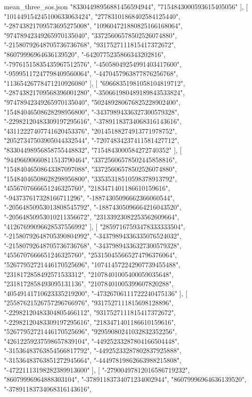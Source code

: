 \begin{filecontents*}[overwrite]{mean_three_sos.json}
    "83304498956881456594944",
    "7154843000593615405056"
   ],
   [
    "101449154245100633063424",
    "27783101868402584125440",
    "-28743821709573695275008",
    "109604721880825166168064",
    "97478942349265970135040",
    "33725606578502526074880",
    "-21580792648705736736768",
    "9317527111815417372672",
    "86079996964636139520",
    "-6420775235866343202816",
    "-79761515835435967512576",
    "-45058049254991403417600",
    "-95995117247798409560064",
    "-4470457963877876256768",
    "11365426778471210926080"
   ],
   [
    "69668351981058104819712",
    "-28743821709568396001280",
    "-350661980489189843533824",
    "97478942349265970135040",
    "502489280676825228902400",
    "15484046508628298956800",
    "-34379894336327300579328",
    "-22982120483309197295616",
    "-37891183734068316143616",
    "43112227407741620453376",
    "20145188274913771978752",
    "20527347503905044332544",
    "-72074834237411581427712",
    "83304498956858755448832",
    "7154843000584272740352"
   ],
   [
    "94496690660811513790464",
    "33725606578502445858816",
    "15484046508643387097088",
    "33725606578502526074880",
    "15484046508628298956800",
    "33535318510598378913792",
    "4556707666651246325760",
    "2183471401186610159616",
    "-943737617328166711296",
    "-18874305096662366060544",
    "-20564850953013808545792",
    "-18874305096664216043520",
    "-20564850953010211356672",
    "23133923082253562609664",
    "41267699096628537556992"
   ],
   [
    "28597167593478333333504",
    "-21580792648705390804992",
    "-34379894336335076524032",
    "-21580792648705736736768",
    "-34379894336327300579328",
    "4556707666651246325760",
    "253150455665274796376064",
    "52677952721446170525696",
    "107414572242907739455488",
    "2318172858492571533312",
    "21078401005400059035648",
    "2318172858493095131136",
    "21078401005399607820288",
    "40549141710623335219200",
    "-47326706111722240475136"
   ],
   [
    "25587621526757296766976",
    "9317527111815698128896",
    "-22982120483304805466112",
    "9317527111815417372672",
    "-22982120483309197295616",
    "2183471401186610159616",
    "52677952721446170525696",
    "92959080241032832352256",
    "42612259237598657839104",
    "-44925233287804166504448",
    "-31536483763854566817792",
    "-44925233287802837925888",
    "-31536483763851272945664",
    "-44497819862663988215808",
    "-47221113198282389913600"
   ],
   [
    "-27900497812016586719232",
    "86079996964888303104",
    "-37891183734071234002944",
    "86079996964636139520",
    "-37891183734068316143616",

\end{filecontents*}

